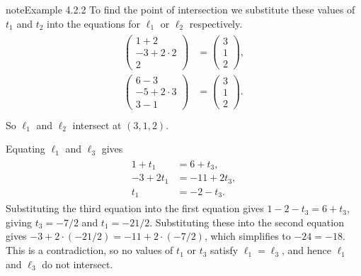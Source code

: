 \documentclass[letterpaper,10pt,english]{jupyterBook}
\begin{document}
\begin{sphinxadmonition}{note}{Example 4.2.2}
\sphinxAtStartPar
To find the point of intersection we substitute these values of \(t_1\) and \(t_2\) into the equations for \(\ell_1\) or \(\ell_2\) respectively.
\begin{equation*}
\begin{split} \begin{align*}
    \begin{pmatrix} 1 + 2 \\ -3 + 2 \cdot 2 \\ 2 \end{pmatrix}  &= \begin{pmatrix} 3 \\ 1 \\ 2 \end{pmatrix}, \\
    \begin{pmatrix} 6 - 3 \\ -5 + 2 \cdot 3 \\ 3 - 1 \end{pmatrix} &= \begin{pmatrix} 3 \\ 1 \\ 2 \end{pmatrix}. \\
\end{align*} \end{split}
\end{equation*}
\sphinxAtStartPar
So \(\ell_1\) and \(\ell_2\) intersect at \((3, 1, 2)\).

\sphinxAtStartPar
Equating \(\ell_1\) and \(\ell_3\) gives
\begin{equation*}
\begin{split} \begin{align*}
    1 + t_1 &= 6 + t_3, \\
    -3 + 2t_1 &= -11 + 2t_3, \\
    t_1 &= -2 - t_3.
\end{align*} \end{split}
\end{equation*}
\sphinxAtStartPar
Substituting the third equation into the first equation gives \(1 - 2 - t_3 = 6 + t_3\), giving \(t_3 = -7/2\) and \(t_1 = -21/2\). Substituting these into the second equation gives \(-3 + 2 \cdot (-21/2) = -11 + 2 \cdot (-7/2)\), which simplifies to \(-24 = -18\). This is a contradiction, so no values of \(t_1\) or \(t_3\) satisfy \(\ell_1 = \ell_3\), and hence \(\ell_1\) and \(\ell_3\) do not intersect.


\end{sphinxadmonition}
\end{document}
